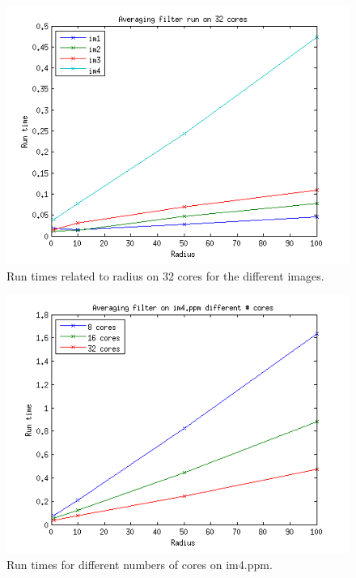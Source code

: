 \documentclass[a4paper,11pt]{article}
\begin{document}
\begin{figure}[!h]
  \caption{Run times related to radius on 32 cores for the different images.}
  \label{32_cores_runtime}
  \includegraphics[scale=0.9]{../plots/32_cores_runtime_radius.png}
\end{figure}
\begin{figure}[!h]
  \caption{Run times for different numbers of cores on im4.ppm.}
  \label{im4}
  \includegraphics[scale=0.9]{../plots/im4_runtime_radius.png}
\end{figure}
\end{document}
